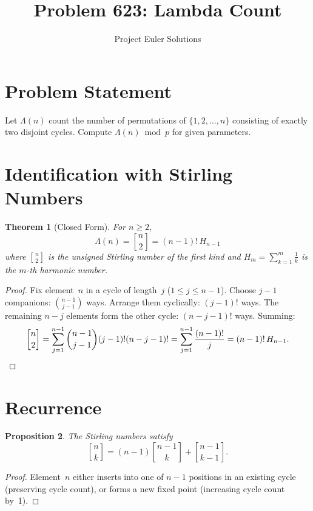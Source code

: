 \documentclass[11pt]{article}
\title{Problem 623: Lambda Count}
\author{Project Euler Solutions}
\date{}
\newtheorem{theorem}{Theorem}
\newtheorem{proposition}[theorem]{Proposition}
\begin{document}
\maketitle

\section{Problem Statement}

Let $\Lambda(n)$ count the number of permutations of $\{1, 2, \ldots, n\}$ consisting of exactly two disjoint cycles. Compute $\Lambda(n) \bmod p$ for given parameters.

\section{Identification with Stirling Numbers}

\begin{theorem}[Closed Form]
\label{thm:closed}
For $n \ge 2$,
\[
\Lambda(n) = \genfrac{[}{]}{0pt}{}{n}{2} = (n-1)!\,H_{n-1}
\]
where $\genfrac{[}{]}{0pt}{}{n}{2}$ is the unsigned Stirling number of the first kind and $H_m = \sum_{k=1}^m \frac{1}{k}$ is the $m$-th harmonic number.
\end{theorem}

\begin{proof}
Fix element~$n$ in a cycle of length~$j$ ($1 \le j \le n-1$). Choose $j-1$ companions: $\binom{n-1}{j-1}$ ways. Arrange them cyclically: $(j-1)!$ ways. The remaining $n-j$ elements form the other cycle: $(n-j-1)!$ ways. Summing:
\[
\genfrac{[}{]}{0pt}{}{n}{2} = \sum_{j=1}^{n-1} \binom{n-1}{j-1}(j-1)!(n-j-1)! = \sum_{j=1}^{n-1} \frac{(n-1)!}{j} = (n-1)!\,H_{n-1}. \qedhere
\]
\end{proof}

\section{Recurrence}

\begin{proposition}
The Stirling numbers satisfy
\[
\genfrac{[}{]}{0pt}{}{n}{k} = (n-1)\genfrac{[}{]}{0pt}{}{n-1}{k} + \genfrac{[}{]}{0pt}{}{n-1}{k-1}.
\]
\end{proposition}

\begin{proof}
Element~$n$ either inserts into one of $n-1$ positions in an existing cycle (preserving cycle count), or forms a new fixed point (increasing cycle count by~1).
\end{proof}
\end{document}

